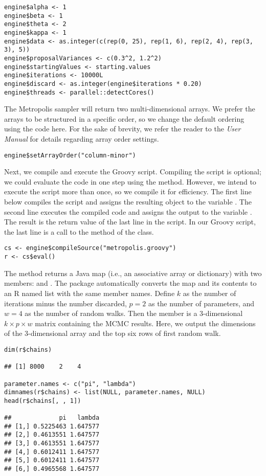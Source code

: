 \begin{verbatim}
engine$alpha <- 1
engine$beta <- 1
engine$theta <- 2
engine$kappa <- 1
engine$data <- as.integer(c(rep(0, 25), rep(1, 6), rep(2, 4), rep(3, 3), 5))
engine$proposalVariances <- c(0.3^2, 1.2^2)
engine$startingValues <- starting.values
engine$iterations <- 10000L
engine$discard <- as.integer(engine$iterations * 0.20)
engine$threads <- parallel::detectCores()
\end{verbatim}

The Metropolis sampler will return two multi-dimensional arrays. We prefer the arrays to be structured in a specific order, so we change the default ordering using the code here. For the sake of brevity, we refer the reader to the \textit{ User Manual} for details regarding array order settings.

\begin{verbatim}
engine$setArrayOrder("column-minor")
\end{verbatim}

Next, we compile and execute the Groovy script. Compiling the script is optional; we could evaluate the code in one step using the   method. However, we intend to execute the script more than once, so we compile it for efficiency. The first line below compiles the script and assigns the resulting object to the variable . The second line executes the compiled code and assigns the output to the variable . The result is the return value of the last line in the script. In our Groovy script, the last line is a call to the method  of the  class.

\begin{verbatim}
cs <- engine$compileSource("metropolis.groovy")
r <- cs$eval()
\end{verbatim}

The  method returns a Java map (i.e., an associative array or dictionary) with two members:  and . The  package automatically converts the map and its contents to an R named list with the same member names. Define $k$ as the number of iterations minus the number discarded, $p = 2$ as the number of parameters, and $w = 4$ as the number of random walks. Then the  member is a 3-dimensional $k \times p \times w$ matrix containing the MCMC results. Here, we output the dimensions of the 3-dimensional array and the top six rows of first random walk.

\begin{verbatim}
dim(r$chains)

## [1] 8000    2    4

parameter.names <- c("pi", "lambda")
dimnames(r$chains) <- list(NULL, parameter.names, NULL)
head(r$chains[, , 1])

##             pi   lambda
## [1,] 0.5225463 1.647577
## [2,] 0.4613551 1.647577
## [3,] 0.4613551 1.647577
## [4,] 0.6012411 1.647577
## [5,] 0.6012411 1.647577
## [6,] 0.4965568 1.647577
\end{verbatim}

